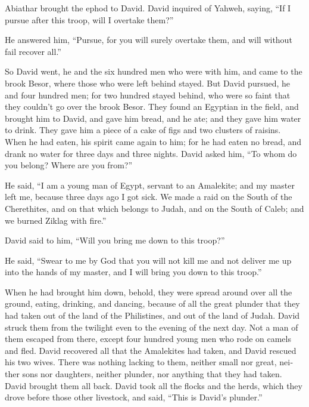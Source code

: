 \begin{paracol}{2}
\begin{otherlanguage}{english}
Abiathar brought the ephod to David.  David inquired of
Yahweh, saying, ``If I pursue after this troop, will I overtake them?''

He answered him, ``Pursue, for you will surely overtake them, and will
without fail recover all.''

 So David went, he and the six hundred men who were with
him, and came to the brook Besor, where those who were left behind
stayed.  But David pursued, he and four hundred men; for
two hundred stayed behind, who were so faint that they couldn't go over
the brook Besor.  They found an Egyptian in the field,
and brought him to David, and gave him bread, and he ate; and they gave
him water to drink.  They gave him a piece of a cake of
figs and two clusters of raisins. When he had eaten, his spirit came
again to him; for he had eaten no bread, and drank no water for three
days and three nights.  David asked him, ``To whom do you
belong? Where are you from?''

He said, ``I am a young man of Egypt, servant to an Amalekite; and my
master left me, because three days ago I got sick.  We
made a raid on the South of the Cherethites, and on that which belongs
to Judah, and on the South of Caleb; and we burned Ziklag with fire.''

 David said to him, ``Will you bring me down to this
troop?''

He said, ``Swear to me by God that you will not kill me and not deliver
me up into the hands of my master, and I will bring you down to this
troop.''

 When he had brought him down, behold, they were spread
around over all the ground, eating, drinking, and dancing, because of
all the great plunder that they had taken out of the land of the
Philistines, and out of the land of Judah.  David struck
them from the twilight even to the evening of the next day. Not a man of
them escaped from there, except four hundred young men who rode on
camels and fled.  David recovered all that the Amalekites
had taken, and David rescued his two wives.  There was
nothing lacking to them, neither small nor great, neither sons nor
daughters, neither plunder, nor anything that they had taken. David
brought them all back.  David took all the flocks and the
herds, which they drove before those other livestock, and said, ``This
is David's plunder.''


\end{otherlanguage}
\end{paracol}
